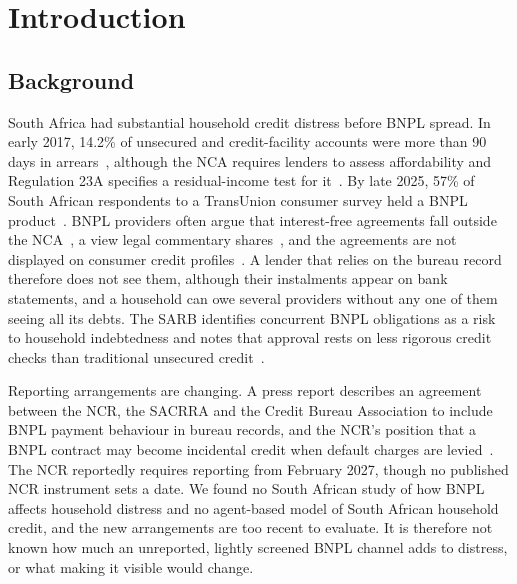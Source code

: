 \section{Introduction}
\label{sec:introduction}

\subsection{Background}
\label{sec:background}

South Africa had substantial household credit distress before \ac{BNPL} spread. In early 2017,
14.2\% of unsecured and credit-facility accounts were more than 90 days in
arrears~\citep[computed from Tables 21 and 23]{ncr_ccmr_2017}, although the \ac{NCA} requires
lenders to assess affordability and Regulation 23A specifies a residual-income test for
it~\citep{sa_nca_2005,sa_ncr_affordability_2015}. By late 2025, 57\% of South African respondents
to a TransUnion consumer survey held a \ac{BNPL} product~\citep{transunion_cir_sa_2026}.
\ac{BNPL} providers often argue that
interest-free agreements fall outside the \ac{NCA}~\citep{sarb_fsr_2026_1}, a view legal
commentary shares~\citep{nortonrose_bnpl_sa}, and the agreements are not displayed on consumer
credit profiles~\citep{dcasa_bnpl_2026,finasa_bnpl_2026}. A lender that relies on the bureau record
therefore does not see them, although their instalments appear on bank statements, and a household
can owe several providers without any one of them seeing all its debts. The \ac{SARB} identifies
concurrent \ac{BNPL} obligations as a risk to household indebtedness and notes that approval rests
on less rigorous credit checks than traditional unsecured credit~\citep{sarb_fsr_2026_1}.

Reporting arrangements are changing. A press report describes an agreement between the \ac{NCR},
the \ac{SACRRA} and the Credit Bureau Association to include \ac{BNPL} payment behaviour in bureau
records, and the \ac{NCR}'s position that a \ac{BNPL} contract may become incidental credit when
default charges are levied~\citep{businessday_bnpl_2026}. The \ac{NCR} reportedly requires
reporting from February 2027, though no published \ac{NCR} instrument sets a date. We found no
South African study of how \ac{BNPL} affects household distress and no agent-based model of South
African household credit, and the new arrangements are too recent to evaluate. It is therefore not
known how much an unreported, lightly screened \ac{BNPL} channel adds to distress, or what making
it visible would change.

